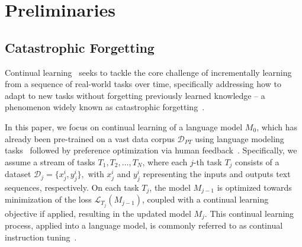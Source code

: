 \section{Preliminaries}
\label{sec2}


\subsection{Catastrophic Forgetting}
Continual learning~\citep{serra2018overcoming, wu2024meta, wu2024continual} seeks to tackle the core challenge of incrementally learning from a sequence of real-world tasks over time,
specifically addressing how
to adapt to new tasks without forgetting previously learned knowledge -- a phenomenon widely known as catastrophic forgetting~\citep{mccloskey1989catastrophic, Kirkpatrick_2017}. 

In this paper, we focus on continual learning of a language model $M_0$, which has already been pre-trained on a vast data corpus $\mathcal{D}_{PT}$ using language modeling tasks~\citep{brown2020language, radford2019language} followed by preference optimization via human feedback~\citep{ouyang2022training}. 
Specifically, we assume 
a stream of tasks $T_1, T_2, \ldots, T_N$, where each $j$-th task $T_j$ consists of  a dataset $\mathcal{D}_j = \{x^i_j, y^i_j\},$ with $x^i_j$ and $y^i_j$ representing the inputs and outputs text sequences, respectively. 
On each task $T_j$, the model $M_{j-1}$ is optimized towards minimization of the loss
$\mathcal{L}_{T_j}(M_{j-1})$, coupled with a continual learning objective if applied, resulting in the updated model $M_j$. 
This continual learning process, applied into a language model, is commonly referred to as continual instruction tuning~\citep{peng2023instruction, chung2024scaling}.



